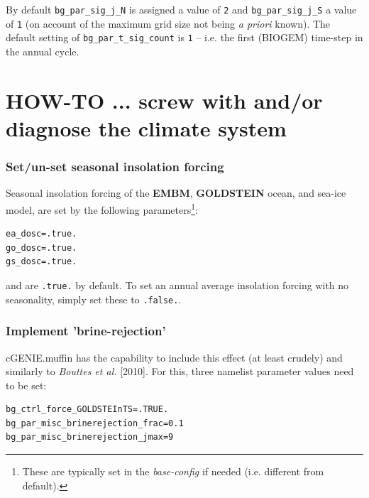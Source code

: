 \documentclass[11pt,fleqn]{book} %
\begin{document}
By default \texttt{bg\_par\_sig\_j\_N} is assigned a value of \texttt{2} and \texttt{bg\_par\_sig\_j\_S} a value of \texttt{1} (on account of the maximum grid size not being \textit{a priori} known).
The default setting of \texttt{bg\_par\_t\_sig\_count} is \texttt{1} -- i.e. the first (BIOGEM) time-step in the annual cycle.


\newpage


\section{HOW-TO ... screw with and/or diagnose the climate system}
\vspace{2mm}

%
\subsubsection{Set/un-set seasonal insolation forcing}

\vspace{1mm}
Seasonal insolation forcing of the \textbf{EMBM}, \textbf{GOLDSTEIN} ocean, and sea-ice model, are set by the following parameters\footnote{These are typically set in the \textit{base-config} if needed (i.e. different from default).}:
\vspace{-1mm}\begin{verbatim}
ea_dosc=.true.
go_dosc=.true.
gs_dosc=.true.
\end{verbatim}\vspace{-1mm}
and are \texttt{.true.} by default.
To set an annual average insolation forcing with no seasonality, simply set these to \texttt{.false.}.

%
\subsubsection{Implement 'brine-rejection'}

cGENIE.muffin has the capability to include this effect (at least crudely) and similarly to \textit{Bouttes et al.} [2010]. For this, three namelist parameter values need to be set:

\vspace{-2mm}\begin{verbatim}
bg_ctrl_force_GOLDSTEInTS=.TRUE.
bg_par_misc_brinerejection_frac=0.1
bg_par_misc_brinerejection_jmax=9
\end{verbatim}\vspace{-2mm}
\end{document}

